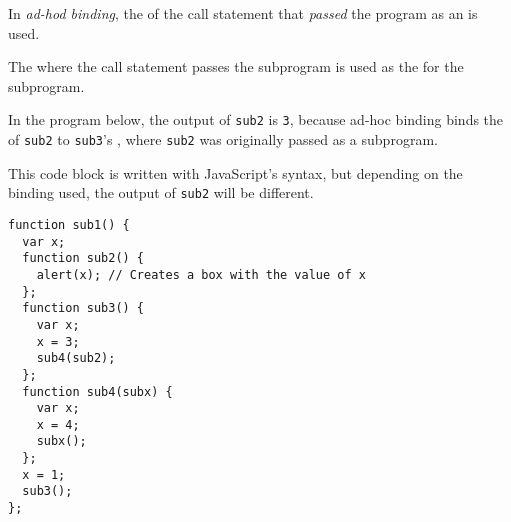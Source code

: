 \begin{definition}\label{def:Ad_Hoc_Binding}
  In \emph{ad-hod binding}, the  of the call statement that \emph{passed} the program as an  is used.

  The  where the call statement passes the subprogram is used as the  for the subprogram.

  \begin{remark}\label{rmk:Ad_Hoc_Binding-Program_Output}
    In the program below, the output of \texttt{sub2} is \texttt{3}, because ad-hoc binding binds the  of \texttt{sub2} to \texttt{sub3}'s , where \texttt{sub2} was originally passed as a subprogram.
  \end{remark}
\end{definition}

This code block is written with JavaScript's syntax, but depending on the binding used, the output of \texttt{sub2} will be different.
\begin{verbatim}
function sub1() {
  var x;
  function sub2() {
    alert(x); // Creates a box with the value of x
  };
  function sub3() {
    var x;
    x = 3;
    sub4(sub2);
  };
  function sub4(subx) {
    var x;
    x = 4;
    subx();
  };
  x = 1;
  sub3();
};
\end{verbatim}
